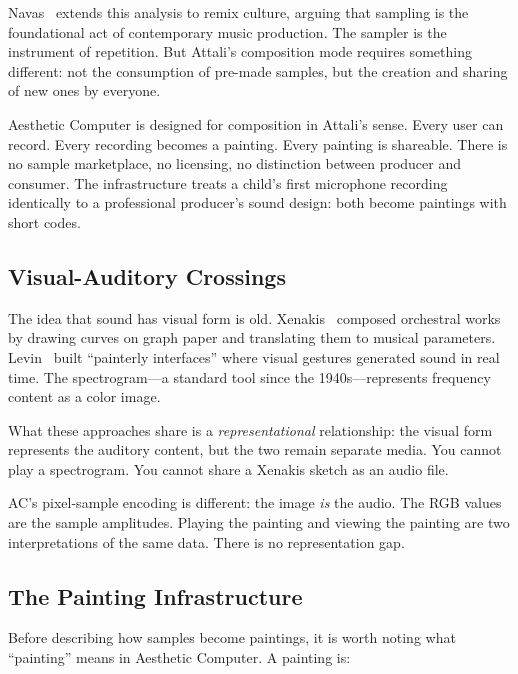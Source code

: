 \documentclass[10pt,letterpaper,twocolumn]{article}
\newcommand{\ac}{Aesthetic Computer}
\begin{document}
Navas~\citep{navas2012remix} extends this analysis to remix culture, arguing that sampling is the foundational act of contemporary music production. The sampler is the instrument of repetition. But Attali's composition mode requires something different: not the consumption of pre-made samples, but the creation and sharing of new ones by everyone.

\ac{} is designed for composition in Attali's sense. Every user can record. Every recording becomes a painting. Every painting is shareable. There is no sample marketplace, no licensing, no distinction between producer and consumer. The infrastructure treats a child's first microphone recording identically to a professional producer's sound design: both become paintings with short codes.

\subsection{Visual-Auditory Crossings}

The idea that sound has visual form is old. Xenakis~\citep{xenakis1992formalized} composed orchestral works by drawing curves on graph paper and translating them to musical parameters. Levin~\citep{levin2000painterly} built ``painterly interfaces'' where visual gestures generated sound in real time. The spectrogram---a standard tool since the 1940s---represents frequency content as a color image.

What these approaches share is a \emph{representational} relationship: the visual form represents the auditory content, but the two remain separate media. You cannot play a spectrogram. You cannot share a Xenakis sketch as an audio file.

AC's pixel-sample encoding is different: the image \emph{is} the audio. The RGB values are the sample amplitudes. Playing the painting and viewing the painting are two interpretations of the same data. There is no representation gap.

\subsection{The Painting Infrastructure}

Before describing how samples become paintings, it is worth noting what ``painting'' means in \ac{}. A painting is:
\end{document}

